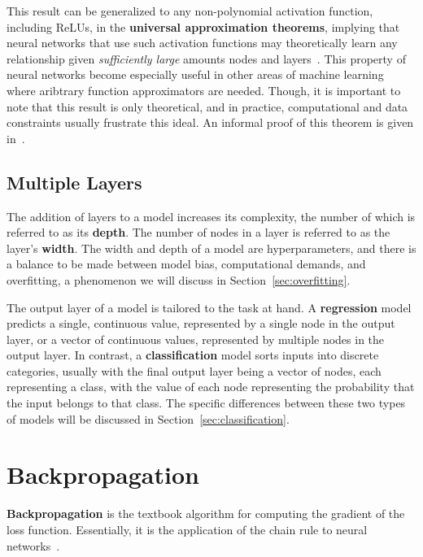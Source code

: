 \documentclass[12pt]{report}
\theoremstyle{definition}
\theoremstyle{remark}
\begin{document}
This result can be generalized to any non-polynomial activation function, including ReLUs, in the \textbf{universal approximation theorems}, implying that neural networks that use such activation functions may theoretically learn any relationship given \textit{sufficiently large} amounts nodes and layers~\cite{hornik_multilayer_1989, kidger_universal_2020, pinkus_approximation_1999}. This property of neural networks become especially useful in other areas of machine learning where aribtrary function approximators are needed. Though, it is important to note that this result is only theoretical, and in practice, computational and data constraints usually frustrate this ideal. An informal proof of this theorem is given in~\cite{nielsen_neural_2019}.

\subsection{Multiple Layers}

The addition of layers to a model increases its complexity, the number of which is referred to as its \textbf{depth}. The number of nodes in a layer is referred to as the layer's \textbf{width}. The width and depth of a model are hyperparameters, and there is a balance to be made between model bias, computational demands, and overfitting, a phenomenon we will discuss in Section~\ref{sec:overfitting}.

The output layer of a model is tailored to the task at hand. A \textbf{regression} model predicts a single, continuous value, represented by a single node in the output layer, or a vector of continuous values, represented by multiple nodes in the output layer. In contrast, a \textbf{classification} model sorts inputs into discrete categories, usually with the final output layer being a vector of nodes, each representing a class, with the value of each node representing the probability that the input belongs to that class. The specific differences between these two types of models will be discussed in Section~\ref{sec:classification}.

\section{Backpropagation}

\textbf{Backpropagation} is the textbook algorithm for computing the gradient of the loss function. Essentially, it is the application of the chain rule to neural networks~\cite{nielsen_neural_2019,sanderson_backpropagation_2017}.
\end{document}
